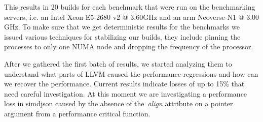 This results in 20 builds for each benchmark that were run on the benchmarking
servers, i.e. an Intel Xeon E5-2680 v2 @ 3.60GHz and an arm Neoverse-N1 @ 3.00
GHz. To make sure that we get deterministic results for the benchmarks we issued
various techniques for stabilizing our builds, they include pinning the processes
to only one NUMA node and dropping the frequency of the processor.

After we gathered the first batch of results, we started analyzing them to
understand what parts of LLVM caused the performance regressions and how can we
recover the performance. Current results indicate losses of up to 15\% that
need careful investigation. At this moment we are investigating a performance
loss in simdjson caused by the absence of the~\textit{align} attribute on a
pointer argument from a performance critical function.
